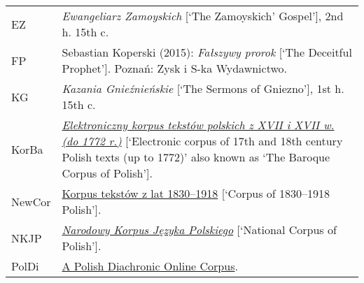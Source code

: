 \documentclass[output=paper
,modfonts
,nonflat]{langsci/langscibook}
\begin{document}
\noindent\begin{tabularx}{\textwidth}{@{}lX@{}}
	EZ & \emph{Ewangeliarz Zamoyskich} [`The Zamoyskich' Gospel'], 2nd h. 15th c. \\
	FP & Sebastian Koperski (2015): \emph{Fałszywy prorok} [`The Deceitful Prophet']. Poznań: Zysk i S-ka Wydawnictwo. \\
	KG &  \emph{Kazania Gnieźnieńskie} [`The Sermons of Gniezno'], 1st h. 15th c. \\
	KorBa & \href{http://korba.edu.pl/query_corpus/} {\emph{Elektroniczny korpus tekstów polskich z XVII i XVII w. (do 1772 r.)}} [`Electronic corpus of 17th and 18th century Polish texts (up to 1772)' also known as `The Baroque Corpus of Polish']. \\
	NewCor & \href{https://szukajwslownikach.uw.edu.pl/f19/} {Korpus tekstów z lat 1830--1918} [`Corpus of 1830--1918 Polish']. \\
  	NKJP & \href{http://nkjp.pl/} {\emph{Narodowy Korpus Języka Polskiego}} [`National Corpus of Polish']. \\
	PolDi & \href{http://rhssl1.uni-regensburg.de/SlavKo/korpus/poldi} {A Polish Diachronic Online Corpus}. \\
\end{tabularx}


{\sloppy\printbibliography[heading=subbibliography,notkeyword=this]}
\end{document}
